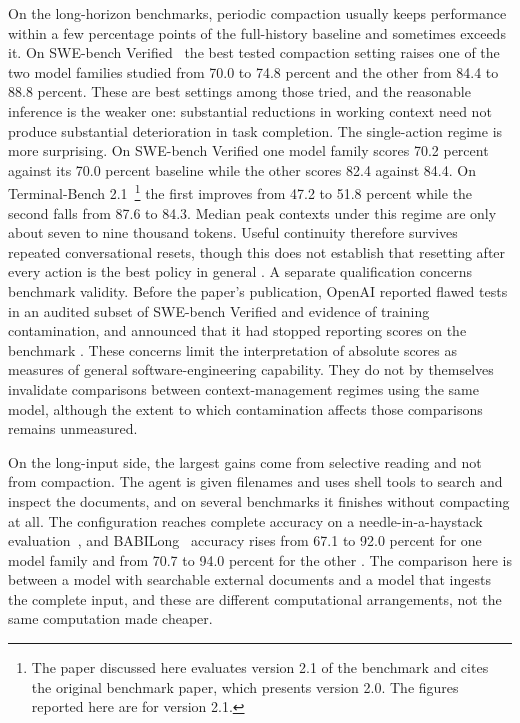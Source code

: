 \documentclass[11pt]{article}
\begin{document}
On the long-horizon benchmarks, periodic compaction usually keeps performance within a few percentage points of the full-history baseline and sometimes exceeds it. On SWE-bench Verified~\cite{swebench,swebenchverified} the best tested compaction setting raises one of the two model families studied from 70.0 to 74.8 percent and the other from 84.4 to 88.8 percent. These are best settings among those tried, and the reasonable inference is the weaker one: substantial reductions in working context need not produce substantial deterioration in task completion. The single-action regime is more surprising. On SWE-bench Verified one model family scores 70.2 percent against its 70.0 percent baseline while the other scores 82.4 against 84.4. On Terminal-Bench 2.1~\cite{terminalbench}\footnote{The paper discussed here evaluates version 2.1 of the benchmark and cites the original benchmark paper, which presents version 2.0. The figures reported here are for version 2.1.} the first improves from 47.2 to 51.8 percent while the second falls from 87.6 to 84.3. Median peak contexts under this regime are only about seven to nine thousand tokens. Useful continuity therefore survives repeated conversational resets, though this does not establish that resetting after every action is the best policy in general \cite{paper}. A separate qualification concerns benchmark validity. Before the paper's publication, OpenAI reported flawed tests in an audited subset of SWE-bench Verified and evidence of training contamination, and announced that it had stopped reporting scores on the benchmark \cite{openai2026}. These concerns limit the interpretation of absolute scores as measures of general software-engineering capability. They do not by themselves invalidate comparisons between context-management regimes using the same model, although the extent to which contamination affects those comparisons remains unmeasured.

On the long-input side, the largest gains come from selective reading and not from compaction. The agent is given filenames and uses shell tools to search and inspect the documents, and on several benchmarks it finishes without compacting at all. The configuration reaches complete accuracy on a needle-in-a-haystack evaluation~\cite{kamradt}, and BABILong~\cite{babilong} accuracy rises from 67.1 to 92.0 percent for one model family and from 70.7 to 94.0 percent for the other \cite{paper}. The comparison here is between a model with searchable external documents and a model that ingests the complete input, and these are different computational arrangements, not the same computation made cheaper.
\end{document}
